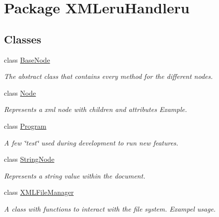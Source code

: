 \hypertarget{namespace_x_m_leru_handleru}{}\section{Package X\+M\+Leru\+Handleru}
\label{namespace_x_m_leru_handleru}
\subsection*{Classes}
\begin{DoxyCompactItemize}
\item 
class \hyperlink{class_x_m_leru_handleru_1_1_base_node}{Base\+Node}
\begin{DoxyCompactList}\small\item\em The abstract class that contains every method for the different nodes. \end{DoxyCompactList}\item 
class \hyperlink{class_x_m_leru_handleru_1_1_node}{Node}
\begin{DoxyCompactList}\small\item\em Represents a xml node with children and attributes Example. \end{DoxyCompactList}\item 
class \hyperlink{class_x_m_leru_handleru_1_1_program}{Program}
\begin{DoxyCompactList}\small\item\em A few \char`\"{}test\char`\"{} used during development to run new features. \end{DoxyCompactList}\item 
class \hyperlink{class_x_m_leru_handleru_1_1_string_node}{String\+Node}
\begin{DoxyCompactList}\small\item\em Represents a string value within the document. \end{DoxyCompactList}\item 
class \hyperlink{class_x_m_leru_handleru_1_1_x_m_l_file_manager}{X\+M\+L\+File\+Manager}
\begin{DoxyCompactList}\small\item\em A class with functions to interact with the file system. Exampel usage. \end{DoxyCompactList}\end{DoxyCompactItemize}
